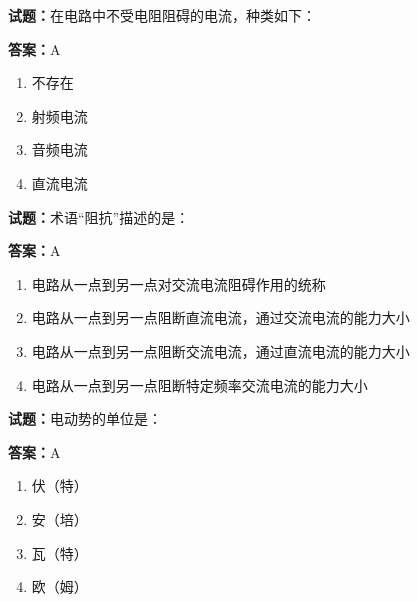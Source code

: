 \documentclass{ctexbook}
\begin{document}




\vspace{1em}

\textbf{试题：}在电路中不受电阻阻碍的电流，种类如下： 

\textbf{答案：}A 

\begin{enumerate}[leftmargin=3em]
  \item 不存在 

  \item 射频电流 

  \item 音频电流 

  \item 直流电流 

\end{enumerate}





\vspace{1em}

\textbf{试题：}术语“阻抗”描述的是： 

\textbf{答案：}A 

\begin{enumerate}[leftmargin=3em]
  \item 电路从一点到另一点对交流电流阻碍作用的统称 

  \item 电路从一点到另一点阻断直流电流，通过交流电流的能力大小 

  \item 电路从一点到另一点阻断交流电流，通过直流电流的能力大小 

  \item 电路从一点到另一点阻断特定频率交流电流的能力大小 

\end{enumerate}






\vspace{1em}

\textbf{试题：}电动势的单位是： 

\textbf{答案：}A 

\begin{enumerate}[leftmargin=3em]
  \item 伏（特） 

  \item 安（培） 

  \item 瓦（特） 

  \item 欧（姆） 

\end{enumerate}
\end{document}
